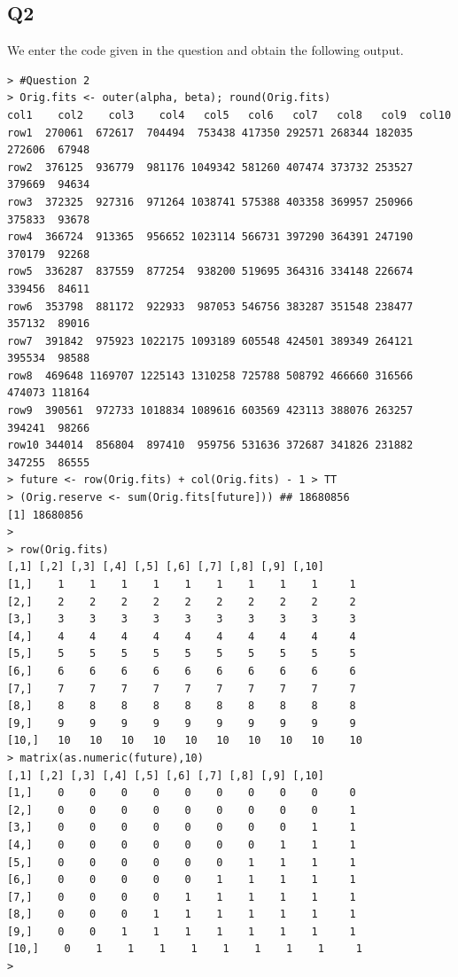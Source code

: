 \documentclass[11pt]{article}
\begin{document}
\subsection*{Q2}

We enter the code given in the question and obtain the following output. 

\begin{verbatim}
> #Question 2
> Orig.fits <- outer(alpha, beta); round(Orig.fits)
col1    col2    col3    col4   col5   col6   col7   col8   col9  col10
row1  270061  672617  704494  753438 417350 292571 268344 182035 272606  67948
row2  376125  936779  981176 1049342 581260 407474 373732 253527 379669  94634
row3  372325  927316  971264 1038741 575388 403358 369957 250966 375833  93678
row4  366724  913365  956652 1023114 566731 397290 364391 247190 370179  92268
row5  336287  837559  877254  938200 519695 364316 334148 226674 339456  84611
row6  353798  881172  922933  987053 546756 383287 351548 238477 357132  89016
row7  391842  975923 1022175 1093189 605548 424501 389349 264121 395534  98588
row8  469648 1169707 1225143 1310258 725788 508792 466660 316566 474073 118164
row9  390561  972733 1018834 1089616 603569 423113 388076 263257 394241  98266
row10 344014  856804  897410  959756 531636 372687 341826 231882 347255  86555
> future <- row(Orig.fits) + col(Orig.fits) - 1 > TT
> (Orig.reserve <- sum(Orig.fits[future])) ## 18680856
[1] 18680856
> 
> row(Orig.fits)
[,1] [,2] [,3] [,4] [,5] [,6] [,7] [,8] [,9] [,10]
[1,]    1    1    1    1    1    1    1    1    1     1
[2,]    2    2    2    2    2    2    2    2    2     2
[3,]    3    3    3    3    3    3    3    3    3     3
[4,]    4    4    4    4    4    4    4    4    4     4
[5,]    5    5    5    5    5    5    5    5    5     5
[6,]    6    6    6    6    6    6    6    6    6     6
[7,]    7    7    7    7    7    7    7    7    7     7
[8,]    8    8    8    8    8    8    8    8    8     8
[9,]    9    9    9    9    9    9    9    9    9     9
[10,]   10   10   10   10   10   10   10   10   10    10
> matrix(as.numeric(future),10)
[,1] [,2] [,3] [,4] [,5] [,6] [,7] [,8] [,9] [,10]
[1,]    0    0    0    0    0    0    0    0    0     0
[2,]    0    0    0    0    0    0    0    0    0     1
[3,]    0    0    0    0    0    0    0    0    1     1
[4,]    0    0    0    0    0    0    0    1    1     1
[5,]    0    0    0    0    0    0    1    1    1     1
[6,]    0    0    0    0    0    1    1    1    1     1
[7,]    0    0    0    0    1    1    1    1    1     1
[8,]    0    0    0    1    1    1    1    1    1     1
[9,]    0    0    1    1    1    1    1    1    1     1
[10,]    0    1    1    1    1    1    1    1    1     1
>
\end{verbatim}
\end{document}
